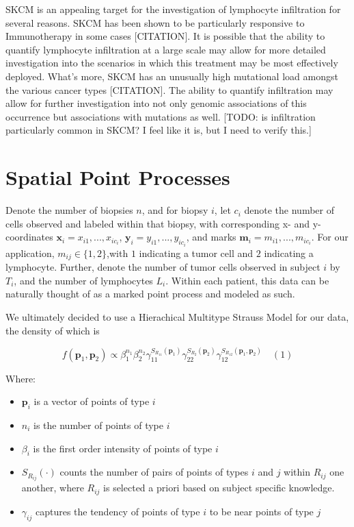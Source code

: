 \documentclass[
]{book}
\providecommand{\tightlist}{%
  \setlength{\itemsep}{0pt}\setlength{\parskip}{0pt}}
\begin{document}
SKCM is an appealing target for the investigation of lymphocyte
infiltration for several reasons. SKCM has been shown to be
particularly responsive to Immunotherapy in some cases {[}CITATION{]}.
It is possible that the ability to quantify lymphocyte
infiltration at a large scale may allow for more detailed
investigation into the scenarios in which this treatment may be
most effectively deployed. What's more, SKCM has an unusually
high mutational load amongst the various cancer types {[}CITATION{]}.
The ability to quantify infiltration may allow for further
investigation into not only genomic associations of this
occurrence but associations with mutations as well. {[}TODO:
is infiltration particularly common in SKCM? I feel like it is,
but I need to verify this.{]}

\hypertarget{spatial-point-processes}{%
\section{Spatial Point Processes}\label{spatial-point-processes}}

Denote the number of biopsies \(n\), and for biopsy \(i\), let \(c_i\)
denote the number of cells observed and labeled within that
biopsy, with corresponding x- and y- coordinates
\(\mathbf{x}_i = x_{i1},...,x_{ic_i}\), \(\mathbf{y}_i = y_{i1},...,y_{ic_i}\),
and marks
\(\mathbf{m}_i = m_{i1},...,m_{ic_i}\). For our application,
\(m_{ij} \in \{1, 2\}\),with \(1\) indicating a tumor cell and \(2\) indicating a
lymphocyte. Further, denote the number of tumor cells observed in
subject \(i\) by \(T_i\), and the number of lymphocytes \(L_i\).
Within each patient, this data can be naturally thought
of as a marked point process and modeled as such.

We ultimately decided to use a Hierachical
Multitype Strauss Model for our data, the density of which is

\[ f(\mathbf{p}_1, \mathbf{p}_2) \propto 
\beta_1^{n_1} \beta_2^{n_2}
\gamma_{11}^{S_{R_{11}}(\mathbf{p}_1)}
\gamma_{22}^{S_{R_{2}}(\mathbf{p}_2)}
\gamma_{12}^{S_{R_{12}}(\mathbf{p}_1, \mathbf{p}_2)}
\quad (1)\]

Where:

\begin{itemize}
\tightlist
\item
  \(\mathbf{p}_i\) is a vector of points of type \(i\)
\item
  \(n_i\) is the number of points of type \(i\)
\item
  \(\beta_i\) is the first order intensity of points of type \(i\)
\item
  \(S_{R_{ij}}(\cdot)\) counts the number of pairs of points of types \(i\) and \(j\) within \(R_{ij}\) one another, where \(R_{ij}\) is selected a priori based on subject specific knowledge.
\item
  \(\gamma_{ij}\) captures the tendency of points of type \(i\) to be near points of type \(j\)
\end{itemize}
\end{document}
